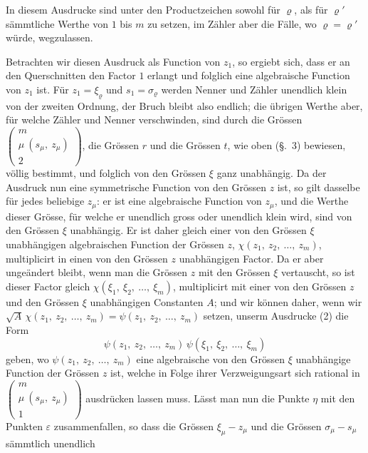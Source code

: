 \documentclass[12pt,a4paper]{book}
\theoremstyle{definition}
\theoremstyle{remark}
\begin{document}
In diesem Ausdrucke sind unter den Productzeichen sowohl für $\varrho$, als für $\varrho'$ sämmtliche Werthe von $1$ bis $m$ zu setzen, im Zähler aber die Fälle, wo $\varrho = \varrho'$ würde, wegzulassen.

Betrachten wir diesen Ausdruck als Function von $z_1$, so ergiebt sich, dass er an den Querschnitten den Factor $1$ erlangt und folglich eine algebraische Function von $z_1$ ist. Für $z_1 = \xi_\varrho$ und $s_1 = \sigma_\varrho$ werden Nenner und Zähler unendlich klein von der zweiten Ordnung, der Bruch bleibt also endlich; die übrigen Werthe aber, für welche Zähler und Nenner verschwinden, sind durch die Grössen $\left(\begin{array}{c} m\\ \mu\ (s_\mu,\ z_\mu)\\ 2 \end{array}\right)$, die Grössen $r$ und die Grössen $t$, wie oben (\S.~3) bewiesen, völlig bestimmt, und folglich von den Grössen $\xi$ ganz unabhängig. Da der Ausdruck nun eine symmetrische Function von den Grössen $z$ ist, so gilt dasselbe für jedes beliebige $z_\mu$: er ist eine algebraische Function von $z_\mu$, und die Werthe dieser Grösse, für welche er unendlich gross oder unendlich klein wird, sind von den Grössen $\xi$ unabhängig. Er ist daher gleich einer von den Grössen $\xi$ unabhängigen algebraischen Function der Grössen $z$, $\chi(z_1,\ z_2,\ \ldots,\ z_m)$, multiplicirt in einen von den Grössen $z$ unabhängigen Factor. Da er aber ungeändert bleibt, wenn man die Grössen $z$ mit den Grössen $\xi$ vertauscht, so ist dieser Factor gleich $\chi(\xi_1,\ \xi_2,\ \ldots,\ \xi_m)$, multiplicirt mit einer von den Grössen $z$ und den Grössen $\xi$ unabhängigen Constanten $A$; und wir können daher, wenn wir $\sqrt{A}\,\chi(z_1,\ z_2,\ \ldots,\ z_m) = \psi(z_1,\ z_2,\ \ldots,\ z_m)$ setzen, unserm Ausdrucke (2) die Form
\begin{equation}
\tag{3} \psi(z_1,\ z_2,\ \ldots,\ z_m)\,\psi(\xi_1,\ \xi_2,\ \ldots,\ \xi_m) \end{equation}
geben, wo $\psi(z_1,\ z_2,\ \ldots,\ z_m)$ eine algebraische von den Grössen $\xi$ unabhängige Function der Grössen $z$ ist, welche in Folge ihrer Verzweigungsart sich rational in $\left(\begin{array}{c} m\\ \mu\ (s_\mu,\ z_\mu)\\ 1 \end{array}\right)$ ausdrücken lassen muss. Lässt man nun die Punkte $\eta$ mit den Punkten $\varepsilon$ zusammenfallen, so dass die Grössen $\xi_\mu - z_\mu$ und die Grössen $\sigma_\mu - s_\mu$ sämmtlich unendlich
\end{document}
